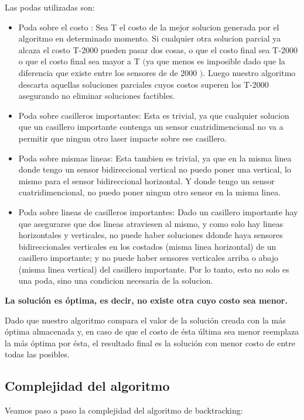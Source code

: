 Las podas utilizadas son:
\begin{itemize}
\item Poda sobre el costo : Sea T el costo de la mejor solucion generada por el algoritmo en determinado momento. Si cualquier otra solucion parcial ya alcaza el costo T-2000 pueden pasar dos cosas, o que el costo final sea T-2000 
o que el costo final sea mayor a T $($ya que menos es imposible dado que la diferencia que existe entre los sensores de de 2000 $)$. Luego nuestro algoritmo descarta aquellas soluciones parciales cuyos costos superen los T-2000
asegurando no eliminar soluciones factibles.  
\item Poda sobre casilleros importantes: Esta es trivial, ya que cualquier solucion que un casillero importante contenga un sensor cuatridimencional no va a permitir que ningun otro laser impacte sobre ese casillero.
\item Poda sobre mismas lineas: Esta tambien es trivial, ya que en la misma linea donde tengo un sensor bidireccional vertical no puedo poner una vertical, lo mismo para el sensor bidireccional horizontal. Y donde 
tengo un sensor cuatridimencional, no puedo poner ningun otro sensor en la misma linea.
\item Poda sobre lineas de casilleros importantes: Dado un casillero importante hay que asegurarse que dos lineas atraviesen al mismo, y como solo hay lineas horizontales y verticales, no puede haber soluciones
ddonde haya sensores bidireccionales verticales en los costados (misma linea horizontal) de un casillero importante; y no puede haber sensores verticales arriba o abajo (misma linea vertical) del casillero importante.
 Por lo tanto, esto no solo es una poda, sino una condicion necesaria de la solucion.
\end{itemize}

\textbf{La solución es óptima, es decir, no existe otra cuyo costo sea menor.} \newline

Dado que nuestro algoritmo compara el valor de la solución creada con la más óptima almacenada y, en caso de que el costo de ésta última sea menor reemplaza la más óptima por ésta, el resultado final es la solución con menor costo de entre todas las posibles.


\subsection{Complejidad del algoritmo}

Veamos paso a paso la complejidad del algoritmo de backtracking:

